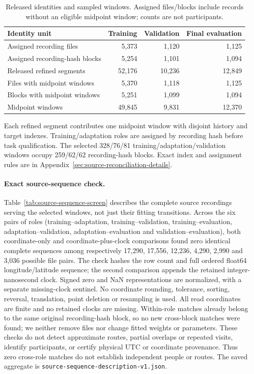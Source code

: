 \documentclass[11pt]{article}
\begin{document}
\begin{table}[htbp]
\centering\small
\caption{Released identities and sampled windows. Assigned files/blocks include
records without an eligible midpoint window; counts are not participants.}
\label{tab:release-partition-identities}
\begin{tabular}{@{}p{.45\linewidth}rrr@{}}
\toprule
Identity unit & Training & Validation & Final evaluation\\
\midrule
Assigned recording files & 5,373 & 1,120 & 1,125\\
Assigned recording-hash blocks & 5,254 & 1,101 & 1,094\\
Released refined segments & 52,176 & 10,236 & 12,849\\
Files with midpoint windows & 5,370 & 1,118 & 1,125\\
Blocks with midpoint windows & 5,251 & 1,099 & 1,094\\
Midpoint windows & 49,845 & 9,831 & 12,370\\
\bottomrule
\end{tabular}
\end{table}

Each refined segment contributes one midpoint window with disjoint history
and target indexes. Training/adaptation roles are assigned by recording hash
before task qualification. The selected 328/76/81 training/adaptation/validation
windows occupy 259/62/62 recording-hash blocks. Exact index and assignment rules
are in Appendix~\ref{sec:source-reconciliation-details}.

\paragraph{Exact source-sequence check.}\label{sec:source-sequence-screen}
Table~\ref{tab:source-sequence-screen} describes the complete source recordings
serving the selected windows, not just their fitting transitions. Across the
six pairs of roles (training--adaptation, training--validation,
training--evaluation, adaptation--validation, adaptation--evaluation and
validation--evaluation), both coordinate-only and coordinate-plus-clock
comparisons found zero identical complete sequences among respectively
17,290, 17,556, 12,236, 4,290, 2,990 and 3,036 possible file pairs.
The check hashes the row count and full ordered float64 longitude/latitude
sequence; the second comparison appends the retained integer-nanosecond clock.
Signed zero and NaN representations are normalized, with a separate missing-clock
sentinel. No coordinate rounding, tolerance, sorting, reversal, translation,
point deletion or resampling is used. All read coordinates are finite and no
retained clocks are missing. Within-role matches already belong to the same
original recording-hash block, so no new cross-block matches were found;
we neither remove files nor change fitted weights or parameters.
These checks do not detect approximate routes, partial overlaps or repeated
visits, identify participants, or certify physical UTC or coordinate provenance.
Thus zero cross-role matches do not establish independent people or routes.
The saved aggregate is \texttt{source-sequence-description-v1.json}.
\end{document}
